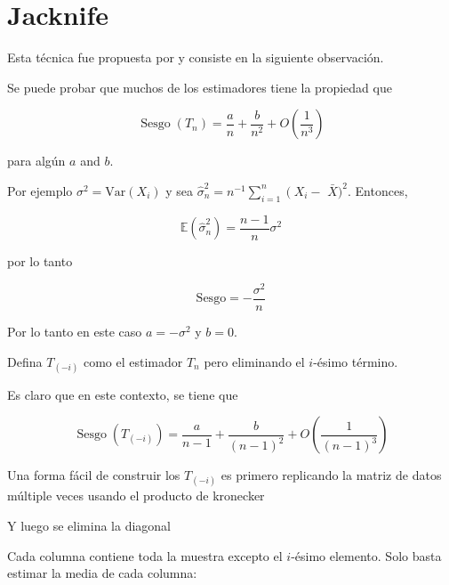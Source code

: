 \documentclass[12pt]{book}\usepackage[]{graphicx}\usepackage[]{color}
\theoremstyle{definition}
\theoremstyle{plain}
\begin{document}
\newpage

\section{Jacknife}

Esta técnica fue propuesta por \cite{Quenouille1949} y consiste en la
siguiente observación.

Se puede probar que muchos de los estimadores tiene la propiedad que

\begin{equation}
\operatorname{Sesgo}\left(T_{n}\right)=\frac{a}{n}+\frac{b}{n^{2}}+O\left(\frac{1}{n^{3}}\right)
\end{equation}

para algún $a$ and $b$.

Por ejemplo $\sigma^{2}=\mathrm{Var}\left(X_{i}\right)$ y sea
$\widehat{\sigma}_{n}^{2}=n^{-1} \sum_{i=1}^{n}\left(X_{i}-\right.$
$\bar{X})^{2}$. Entonces,

\begin{equation*}
\mathbb{E}\left(\widehat{\sigma}_{n}^{2}\right)=
\frac{n-1}{n}\sigma^{2}
\end{equation*}

por lo tanto

\begin{equation*}
\mathrm{Sesgo} = -\frac{\sigma^{2}}{n}
\end{equation*}

Por lo tanto en este caso $a=-\sigma^{2}$ y $b=0$.

Defina \(T_{(-i)}\) como el estimador \(T_{n}\) pero eliminando el
\(i\)-ésimo término.

Es claro que en este contexto, se tiene que

\begin{equation}
\operatorname{Sesgo}\left(T_{(-i)}\right)=\frac{a}{n-1}+\frac{b}{(n-1)^{2}}+O\left(\frac{1}{(n-1)^{3}}\right)
\end{equation}

\begin{laboratorio}{}{}
    Una forma fácil de construir los \(T_{(-i)}\) es primero replicando
    la matriz de datos múltiple veces usando el producto de kronecker



    Y luego se elimina la diagonal



    Cada columna contiene toda la muestra excepto el \(i\)-ésimo
    elemento. Solo basta estimar la media de cada columna:



\end{laboratorio}
\end{document}
